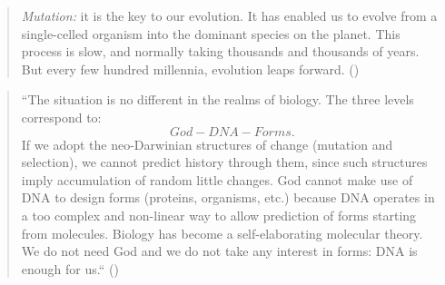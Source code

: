 \begin{quote}
\emph{Mutation:} it is the key to our evolution. It has enabled us to evolve
from a single-celled organism into the dominant species on the planet. This
process is slow, and normally taking thousands and thousands of years. But
every few hundred millennia, evolution leaps forward. (\cite{singer2000}) \end{quote}

\begin{quote}
``The situation is no different in the realms of biology. The three
levels correspond to:
\begin{equation*}
God - DNA - Forms.
\end{equation*}
If we adopt the neo-Darwinian structures of change (mutation and selection), we
cannot predict history through them, since such structures imply accumulation
of random little changes. God cannot make use of DNA to design forms (proteins,
organisms, etc.) because DNA operates in a too complex and non-linear way to
allow prediction of forms starting from molecules. Biology has become a
self-elaborating molecular theory. We do not need God and we do not take any
interest in forms: DNA is enough for us.`` (\cite{Sermonti2006})
\end{quote}
